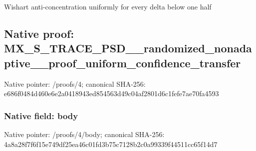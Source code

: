 \documentclass[10pt,a4paper]{article}
\begin{document}
\begingroup\raggedright\sloppy Wishart anti-concentration uniformly for every delta below one half\par\endgroup

\subsection{Native proof: MX\_\allowbreak{}S\_\allowbreak{}TRACE\_\allowbreak{}PSD\_\allowbreak{}\_\allowbreak{}randomized\_\allowbreak{}nonadaptive\_\allowbreak{}\_\allowbreak{}proof\_\allowbreak{}uniform\_\allowbreak{}confidence\_\allowbreak{}transfer}
Native pointer: /proofs/4; canonical SHA-256: e686f0484d460e6e2a0418943ed854563d49c04af2801d6c1fefe7ae70fa4593

\subsubsection{Native field: body}
Native pointer: /proofs/4/body; canonical SHA-256: 4a8a28f7f6f15e749df25ea46c01fd3b75c7128b2c0a99339f44511cc65f14d7
\end{document}
